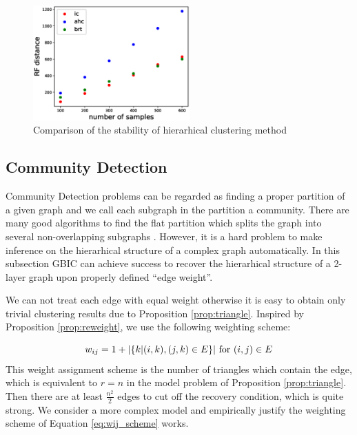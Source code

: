 \begin{figure}
\centering
\includegraphics[width=6cm]{pic/plot_results.eps}
\caption{Comparison of the stability of hierarhical clustering method}\label{fig:shc}
\end{figure}
\subsection{Community Detection}\label{subsec:cd}
Community Detection problems can be regarded as finding a proper partition of a given graph and we call each subgraph in the partition a community. There are many good algorithms
to find the flat partition which splits the graph into several non-overlapping subgraphs \citep{malliaros2013clustering}. However, it is a hard problem to make inference on the hierarhical structure of a complex graph automatically. In this subsection GBIC can achieve success to recover the hierarhical structure of a 2-layer graph upon properly defined ``edge weight''. 

We can not treat each edge with equal weight otherwise it is easy to obtain only trivial clustering results due to Proposition \ref{prop:triangle}. Inspired by Proposition \ref{prop:reweight}, we use the following weighting scheme:

\begin{equation}\label{eq:wij_scheme}
    w_{ij} = 1 + \lvert\{k | (i,k),(j,k) \in E \}\rvert \textrm{ for } (i,j) \in E
\end{equation}
This weight assignment scheme is the number of triangles which contain the edge, which is equivalent to $r=n$ in the model problem of Proposition \ref{prop:triangle}. Then there are
at least $\frac{n^2}{2}$ edges to cut off the recovery condition, which is quite strong. We consider a more complex model and empirically justify the weighting scheme of Equation 
\eqref{eq:wij_scheme} works.

